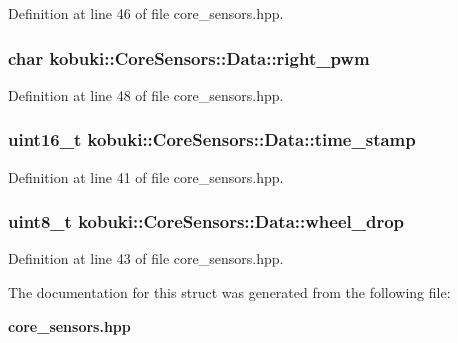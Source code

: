 \-Definition at line 46 of file core\-\_\-sensors.\-hpp.

\subsubsection[{right\-\_\-pwm}]{\setlength{\rightskip}{0pt plus 5cm}char {\bf kobuki\-::\-Core\-Sensors\-::\-Data\-::right\-\_\-pwm}}\label{structkobuki_1_1CoreSensors_1_1Data_a7a32588b92f15eff9cef99ebe2d600b2}


\-Definition at line 48 of file core\-\_\-sensors.\-hpp.

\subsubsection[{time\-\_\-stamp}]{\setlength{\rightskip}{0pt plus 5cm}uint16\-\_\-t {\bf kobuki\-::\-Core\-Sensors\-::\-Data\-::time\-\_\-stamp}}\label{structkobuki_1_1CoreSensors_1_1Data_a2ef0c11257ef7a25c0691e87659e138b}


\-Definition at line 41 of file core\-\_\-sensors.\-hpp.

\subsubsection[{wheel\-\_\-drop}]{\setlength{\rightskip}{0pt plus 5cm}uint8\-\_\-t {\bf kobuki\-::\-Core\-Sensors\-::\-Data\-::wheel\-\_\-drop}}\label{structkobuki_1_1CoreSensors_1_1Data_a47fa534f8b8da4ef4dfed6ecdaa9e2e5}


\-Definition at line 43 of file core\-\_\-sensors.\-hpp.



\-The documentation for this struct was generated from the following file\-:\begin{DoxyCompactItemize}
\item 
{\bf core\-\_\-sensors.\-hpp}\end{DoxyCompactItemize}
